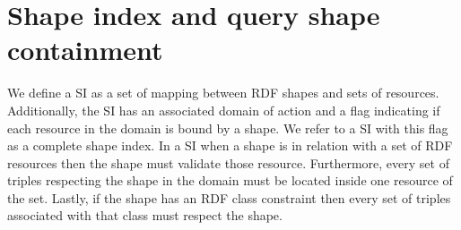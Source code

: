 \section{Shape index and query shape containment}


We define a SI as a set of mapping between RDF shapes and sets of resources.
Additionally, the SI has an associated domain of action
and a flag indicating if each resource in the domain is bound by a shape. 
We refer to a SI with this flag as a complete shape index.
In a SI when a shape is in relation with a set of RDF resources then the shape must validate those resource.
Furthermore, every set of triples respecting the shape in the domain must be located inside one resource of the set.
Lastly, if the shape has an RDF class constraint
then every set of triples associated with that class must respect the shape.

